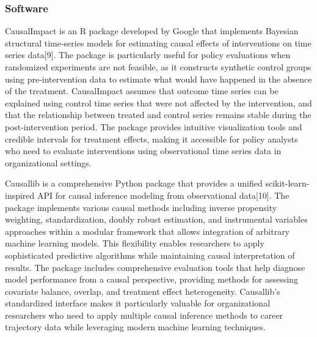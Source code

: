 \documentclass[main.tex]{subfiles}
\begin{document}
\subsubsection{Software}


CausalImpact is an R package developed by Google that implements Bayesian structural time-series models for estimating causal effects of interventions on time series data[9]. The package is particularly useful for policy evaluations when randomized experiments are not feasible, as it constructs synthetic control groups using pre-intervention data to estimate what would have happened in the absence of the treatment. CausalImpact assumes that outcome time series can be explained using control time series that were not affected by the intervention, and that the relationship between treated and control series remains stable during the post-intervention period. The package provides intuitive visualization tools and credible intervals for treatment effects, making it accessible for policy analysts who need to evaluate interventions using observational time series data in organizational settings.


Causallib is a comprehensive Python package that provides a unified scikit-learn-inspired API for causal inference modeling from observational data[10]. The package implements various causal methods including inverse propensity weighting, standardization, doubly robust estimation, and instrumental variables approaches within a modular framework that allows integration of arbitrary machine learning models. This flexibility enables researchers to apply sophisticated predictive algorithms while maintaining causal interpretation of results. The package includes comprehensive evaluation tools that help diagnose model performance from a causal perspective, providing methods for assessing covariate balance, overlap, and treatment effect heterogeneity. Causallib's standardized interface makes it particularly valuable for organizational researchers who need to apply multiple causal inference methods to career trajectory data while leveraging modern machine learning techniques.

\end{document}
